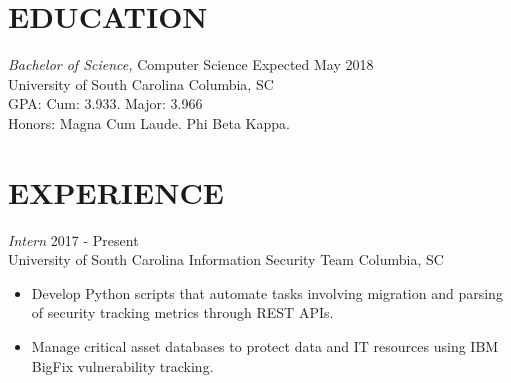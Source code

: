 \documentclass[line,margin]{res}
\begin{document}
\address{800 State St. Apt. 230}
\address{West Columbia, SC 29169}

\begin{resume}
 
\section{EDUCATION} {\sl Bachelor of Science,} 
				Computer Science \hfill Expected May 2018 \\
                University of South Carolina \hfill Columbia, SC \\
                GPA: Cum: 3.933. Major: 3.966 \\
                Honors: Magna Cum Laude. Phi Beta Kappa.
                 
\section{EXPERIENCE} {\sl Intern} \hfill 2017 - Present \\
                University of South Carolina Information Security Team \hfill Columbia, SC
                 \begin{itemize}  \itemsep -2pt %
                 \item Develop Python scripts that automate tasks involving migration and parsing of security tracking metrics through REST APIs.
                 \item Manage critical asset databases to protect data and IT resources using IBM BigFix vulnerability tracking.
                \end{itemize}
                 


\end{resume}
\end{document}
